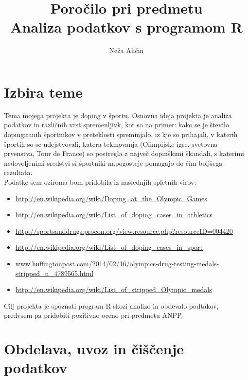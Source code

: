 \documentclass[11pt,a4paper]{article}
\begin{document}
\title{Poročilo pri predmetu \\
Analiza podatkov s programom R}
\author{Neža Ahčin}
\maketitle
\newpage
\section{Izbira teme}

Tema mojega projekta je doping v športu. Osnovna ideja projekta je analiza podatkov in različnih vrst spremenljivk, kot so na primer: kako se je število dopingiranih športnikov v preteklosti spreminjalo, iz kje so prihajali, v katerih športih so se udejstvovali, katera tekmovanja (Olimpijske igre, svetovna prvenstva, Tour de France) so postregla z največ dopinškimi škandali, s katerimi nedovoljenimi sredstvi si športniki napogosteje pomagajo do čim boljšega rezultata.\\

Podatke sem oziroma bom pridobila iz naslednjih spletnih virov:
 
\begin{itemize} 
\item \url{http://en.wikipedia.org/wiki/Doping_at_the_Olympic_Games}
\item \url{http://en.wikipedia.org/wiki/List_of_doping_cases_in_athletics}
\item \url{http://sportsanddrugs.procon.org/view.resource.php?resourceID=004420}
\item \url{http://en.wikipedia.org/wiki/List_of_doping_cases_in_sport}
\item \url{www.huffingtonpost.com/2014/02/16/olympics-drug-testing-medals-stripped_n_4789565.html}
\item \url{http://en.wikipedia.org/wiki/List_of_stripped_Olympic_medals}\\
\end{itemize}
Cilj projekta je spoznati program R skozi analizo in obdevalo podtakov, predvsem pa pridobiti pozitivno oceno pri predmetu ANPP.

\newpage

\section{Obdelava, uvoz in čiščenje podatkov}
\end{document}
